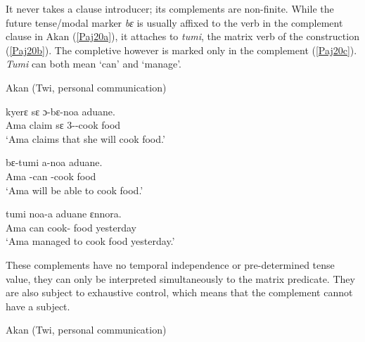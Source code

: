 \documentclass[output=paper]{langscibook}
\begin{document}
It never takes a clause introducer; its complements are non-finite. While the future tense/modal marker \emph{bɛ} is usually affixed to the verb in the complement clause in Akan (\ref{Paj20a}), it attaches to \emph{tumi}, the matrix verb of the construction (\ref{Paj20b}). The completive however is marked only in the complement (\ref{Paj20c}). \emph{Tumi} can both mean ‘can’ and ‘manage’.\largerpage[-1]

\begin{exe}
\ex\label{Paj18}Akan (Twi, personal communication)
\begin{xlist}
\ex \label{Paj18a} 
 {kyer{ɛ}} {s{ɛ}} {{ɔ}-b{ɛ}-noa} {aduane.}\\
  Ama claim s{ɛ} 3{\sg}--cook food\\
\glt `Ama claims that she will cook food.'

\ex \label{Paj18b} 
 {b{ɛ}-tumi} {a-noa} {aduane.}\\
  Ama -can -cook food\\
\glt `Ama will be able to cook food.'

\ex \label{Paj18c} 
 {tumi} {noa-a} {aduane} {{ɛ}nnora.}\\
  Ama can cook-{\comp} food yesterday\\
\glt `Ama managed to cook food yesterday.'
\end{xlist}
\end{exe}\largerpage
 

These complements have no temporal independence or pre-determined tense value, they can only be interpreted simultaneously to the matrix predicate. They are also subject to exhaustive control, which means that the complement cannot have a subject. 

\begin{exe}
\ex \label{Paj19} Akan (Twi, personal communication)
\begin{xlist}



\end{xlist}
\end{exe}
 
\end{document}
